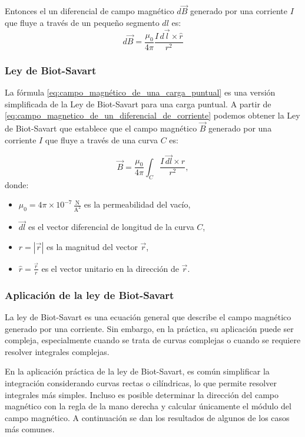 Entonces el un diferencial de campo magnético \(d\vec{B}\) generado por una corriente \(I\) que fluye a través de un pequeño segmento \(dl\) es:
\begin{equation}
  \boxed{d\vec{B} = \frac{\mu_0}{4\pi} \frac{I \, d\vec{l} \times \hat{r}}{r^2}}
  \label{eq:campo_magnetico_de_un_diferencial_de_corriente}
\end{equation}

\subsubsection{Ley de Biot-Savart}

La fórmula \ref{eq:campo_magnético_de_una_carga_puntual} es una versión simplificada de la Ley de Biot-Savart para una carga puntual. A partir de \eqref{eq:campo_magnetico_de_un_diferencial_de_corriente} podemos obtener la Ley de Biot-Savart que establece que el campo magnético \(\vec{B}\) generado por una corriente \(I\) que fluye a través de una curva \(C\) es:

\begin{equation}
  \vec{B} = \frac{\mu_0}{4\pi} \int_C \frac{I \, \vec{dl} \times \hat{r}}{r^2},
\end{equation}
donde:
\begin{itemize}
  \item \(\mu_0 = 4 \pi \times 10^{-7} \, \frac{\si{\newton}}{\si{\ampere\squared}}\) es la permeabilidad del vacío,
  \item \(\vec{dl}\) es el vector diferencial de longitud de la curva \(C\),
  \item \(r = |\vec{r}|\) es la magnitud del vector \(\vec{r}\),
  \item \(\hat{r} = \frac{\vec{r}}{r}\) es el vector unitario en la dirección de \(\vec{r}\).
\end{itemize}

\subsubsection{Aplicación de la ley de Biot-Savart}

La ley de Biot-Savart es una ecuación general que describe el campo magnético generado por una corriente. Sin embargo, en la práctica, su aplicación puede ser compleja, especialmente cuando se trata de curvas complejas o cuando se requiere resolver integrales complejas.

En la aplicación práctica de la ley de Biot-Savart, es común simplificar la integración considerando curvas rectas o cilíndricas, lo que permite resolver integrales más simples. Incluso es posible determinar la dirección del campo magnético con la regla de la mano derecha y calcular únicamente el módulo del campo magnético. A continuación se dan los resultados de algunos de los casos más comunes.


